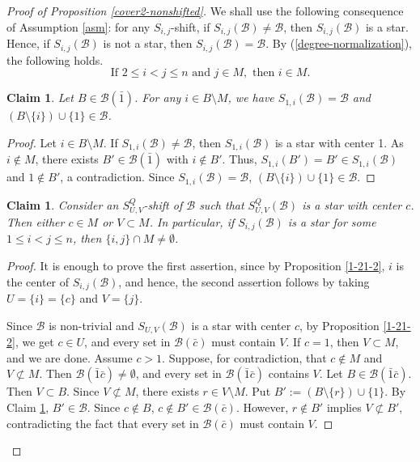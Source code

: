 \documentclass[a4paper,11pt]{article}
\newtheorem{claim}[theorem]{Claim}
\newcommand{\m}{\mathcal}
\begin{document}
\begin{proof}[Proof of Proposition \ref{cover2-nonshifted}]

We shall use the following consequence of Assumption \ref{asm}: 
for any $S_{i,j}$-shift, if $S_{i,j}(\m B)\ne \m B$, then
$S_{i,j}(\m B)$ is a star. Hence, if $S_{i,j}(\m B)$ is not a star, then
$S_{i,j}(\m B)=\m B$.
By (\ref{degree-normalization}), the following holds.
\begin{equation}\label{M-degree-downward}
\text{If } 2\le i<j\le n \text{ and } j\in M,\text{ then } i\in M.
\end{equation}

 
\begin{claim}\label{1-30-1}
Let $B\in \m B(\bar1)$. For any $i\in B\setminus M$, we have  $S_{1,i}(\m B)=\m B$ and $(B\setminus \{i\})\cup \{1\}\in \m B$.
\end{claim}
 
\begin{proof}
Let $i\in B\setminus M$. 
If $S_{1,i}(\m B)\ne \m B$, then $S_{1,i}(\m B)$ is a star with center 1. 
As $i\not\in M$, there exists $B'\in \m B(\bar{1})$ with $i\not\in B'$. Thus, $S_{1,i}(B')=B' \in S_{1,i}(\m B)$ and $1\not\in B'$,  a contradiction. 
Since $S_{1,i}(\m B)=\m B$, $(B\setminus \{i\})\cup \{1\}\in \m B$.
\end{proof}

\begin{claim}\label{1-29-4}
Consider an $S^{Q}_{U,V}$-shift of $\m B$ such that  $S^{Q}_{U,V}(\m B)$ is a star with center $c$. Then  either $c\in  M$ or $V\subset M$. In particular, if $S_{i,j}(\m B)$ is a star for some $1\le i<j \le n$, then $\{i,j\}\cap M\ne \emptyset$. 
\end{claim}
 
\begin{proof}
It is enough to prove the first assertion, since
by Proposition \ref{1-21-2}, $i$ is the center of $S_{i,j}(\m B)$, and hence, 
the second assertion follows by taking $U=\{i\}=\{c\}$ and $V=\{j\}$.

Since $\m B$ is non-trivial and $S_{U,V}(\m B)$ is a star with center $c$, by Proposition \ref{1-21-2}, we get $c\in U$, and every set in $\m B(\bar{c})$ must contain $V$. 
If $c=1$, then $V\subset M$, and we are done. Assume $c>1$. Suppose, for contradiction, that $c\not \in M$ and $V\not\subset M$. 
Then $\m B(\bar1 \bar c)\ne \emptyset$, and every set in $\m B(\bar1 \bar c)$ contains $V$. Let $B\in \m B(\bar1 \bar c)$. Then $V\subset B$. 
Since $V\not\subset M$, there exists $r\in V\setminus M$. Put $B':=(B\setminus \{r\}) \cup \{1\}$.
By Claim \ref{1-30-1}, $B'\in \m B$.   
Since $c\not\in B$, $c\not\in B'\in \m B(\bar c)$. 
However, $r\not\in B'$ implies $V\not\subset B'$, contradicting the fact that every set in $\m B(\bar{c})$ must contain $V$. 
\end{proof}


\end{proof}
\end{document}
